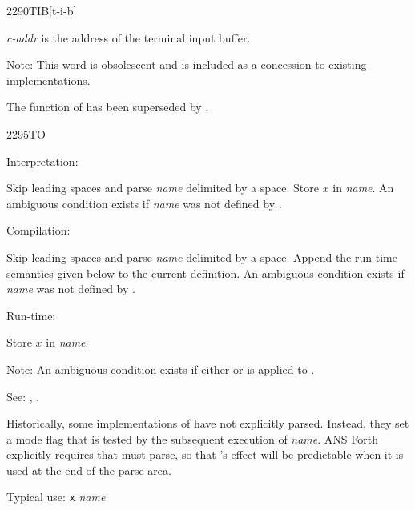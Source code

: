 \begin{newword}{2290}{TIB}[t-i-b]

	\emph{c-addr} is the address of the terminal input buffer.

\item[Note:]
	This word is obsolescent and is included as a concession to
	existing implementations.

	\begin{rationale} %
		The function of  has been superseded by
		.
	\end{rationale}
\end{newword}


\begin{newword*}{2295}{TO}
\item[Interpretation:]

	Skip leading spaces and parse \emph{name} delimited by a space.
	Store $x$ in \emph{name}. An ambiguous condition exists if
	\emph{name} was not defined by .

\item[Compilation:]

	Skip leading spaces and parse \emph{name} delimited by a space.
	Append the run-time semantics given below to the current
	definition. An ambiguous condition exists if \emph{name} was not
	defined by .

\item[Run-time:]

	Store $x$ in \emph{name}.

\item[Note:]
	An ambiguous condition exists if either  or
	\word{[COMPILE]} is applied to .

\item[See:]
	,
	.

	\begin{rationale} %
		Historically, some implementations of  have not
		explicitly parsed. Instead, they set a mode flag that is
		tested by the subsequent execution of \emph{name}. ANS Forth
		explicitly requires that  must parse, so that
		's effect will be predictable when it is used at the
		end of the parse area.

		Typical use: \texttt{x}  \emph{name}
	\end{rationale}
\end{newword*}


